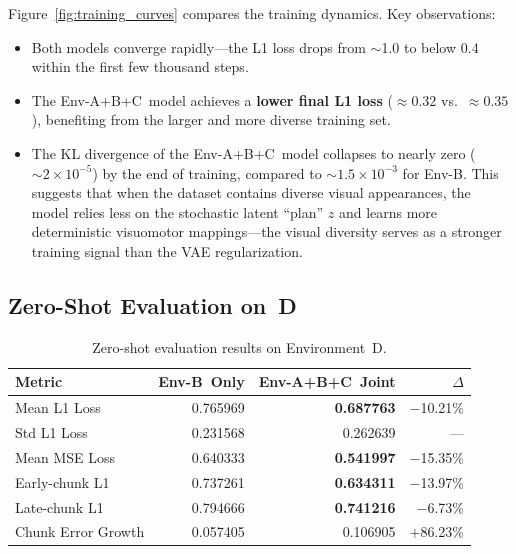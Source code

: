 \documentclass[twoside,twocolumn,10pt]{article}
\newcommand{\envB}{B}
\newcommand{\envABC}{A+B+C}
\newcommand{\envD}{D}
\begin{document}
Figure~\ref{fig:training_curves} compares the training dynamics.  Key
observations:

\begin{itemize}[nosep]
  \item Both models converge rapidly---the L1 loss drops from $\sim$1.0 to
        below 0.4 within the first few thousand steps.
  \item The Env-\envABC~model achieves a \textbf{lower final L1 loss}
        ($\approx 0.32$ vs.~$\approx 0.35$), benefiting from the larger and more
        diverse training set.
  \item The KL divergence of the Env-\envABC~model collapses to nearly zero
        ($\sim 2\times 10^{-5}$) by the end of training, compared to
        $\sim 1.5\times 10^{-3}$ for Env-\envB.  This suggests that when the
        dataset contains diverse visual appearances, the model relies less on
        the stochastic latent ``plan'' $z$ and learns more deterministic
        visuomotor mappings---the visual diversity serves as a stronger training
        signal than the VAE regularization.
\end{itemize}

\subsection{Zero-Shot Evaluation on~\envD{}}
\label{sec:zero_shot}

\begin{table}[H]
  \centering
  \caption{Zero-shot evaluation results on Environment~\envD.}
  \label{tab:eval_results}
  \begin{tabular}{lrrr}
    \toprule
    Metric & Env-\envB~Only & Env-\envABC~Joint & $\Delta$ \\
    \midrule
    Mean L1 Loss      & 0.765969 & \textbf{0.687763} & $-$10.21\% \\
    Std L1 Loss       & 0.231568 & 0.262639   & --- \\
    Mean MSE Loss     & 0.640333 & \textbf{0.541997} & $-$15.35\% \\
    Early-chunk L1    & 0.737261 & \textbf{0.634311} & $-$13.97\% \\
    Late-chunk L1     & 0.794666 & \textbf{0.741216} & $-$6.73\% \\
    Chunk Error Growth & 0.057405 & 0.106905   & +86.23\% \\
    \bottomrule
  \end{tabular}
\end{table}
\end{document}
